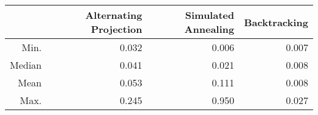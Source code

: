 \begin{table}[ht]
\begin{center}
\begin{tabular}{rrrr}
  \hline
 & Alternating Projection & Simulated Annealing & Backtracking \\ 
  \hline
Min. & 0.032 & 0.006 & 0.007 \\ 
  Median & 0.041 & 0.021 & 0.008 \\ 
  Mean & 0.053 & 0.111 & 0.008 \\ 
  Max. & 0.245 & 0.950 & 0.027 \\ 
   \hline
\end{tabular}
\end{center}
\end{table}
